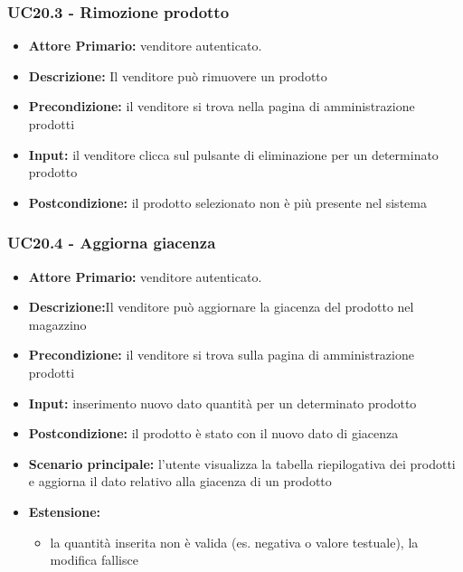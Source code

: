 \subsubsection{UC20.3 - Rimozione prodotto}
\label{UC20.3}
\begin{itemize}
    \item \textbf{Attore Primario:}  venditore autenticato.
    \item \textbf{Descrizione:} Il venditore può rimuovere un prodotto
    \item \textbf{Precondizione:} il venditore si trova nella pagina di amministrazione prodotti
    \item \textbf{Input:} il venditore clicca sul pulsante di eliminazione per un determinato prodotto
    \item \textbf{Postcondizione:} il prodotto selezionato non è più presente nel sistema 
\end{itemize}


\subsubsection{UC20.4 - Aggiorna giacenza}
\label{UC20.4}
\begin{itemize}
    \item \textbf{Attore Primario:}  venditore autenticato.
    \item \textbf{Descrizione:}Il venditore può aggiornare la giacenza del prodotto nel magazzino
    \item \textbf{Precondizione:} il venditore si trova sulla pagina di amministrazione prodotti
    \item \textbf{Input:} inserimento nuovo dato quantità per un determinato prodotto
    \item \textbf{Postcondizione:} il prodotto è stato con il nuovo dato di giacenza
    \item \textbf{Scenario principale:} l’utente visualizza la tabella riepilogativa dei prodotti e aggiorna il dato relativo alla giacenza di un prodotto
    \item \textbf{Estensione:}
    \begin{itemize}
        \item la quantità inserita non è valida (es. negativa o valore testuale), la modifica fallisce
    \end{itemize}
\end{itemize}


